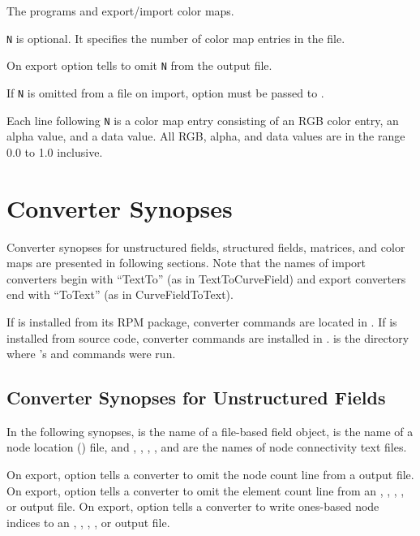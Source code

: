 The programs  and 
export/import color maps.

\verb|N| is optional.  It specifies the number of color map entries in
the file.

On export option  tells  to
omit \verb|N| from the output file.

If \verb|N| is omitted from a file on import, option
 must be passed to .

Each line following \verb|N| is a color map entry consisting of an RGB
color entry, an alpha value, and a data value.  All RGB, alpha, and
data values are in the range 0.0 to 1.0 inclusive.

\section{Converter Synopses}
\label{sec:converter_synopses}

Converter synopses for unstructured fields, structured fields, matrices,
and color maps are presented in following sections.   Note that
the names of import converters begin with ``TextTo'' (as in
TextToCurveField) and export converters end with ``ToText'' (as in
CurveFieldToText).

If \sr{} is installed from its RPM package, converter commands are
located in .  If \sr{} is installed
from source code, converter commands are installed in
.   is
the directory where \sr{}'s  and 
commands were run.

\subsection{Converter Synopses for Unstructured Fields}
\label{sec:unstruct_field_synopses}

In the following synopses,  is the name of a \sr{}
file-based field object,  is the name of a node location
() file, and , ,
, , and  are the names of node
connectivity text files.

On export, option  tells a converter to omit the
node count line from a  output file.  On export, option
 tells a converter to omit the element count
line from an , , ,
, or  output file.  On export, option
 tells a converter to write ones-based node
indices to an , , ,
, or  output file.

